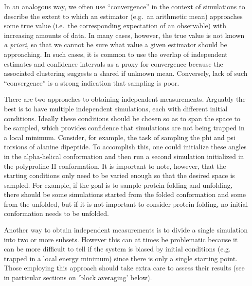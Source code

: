 In an analogous way, we often use ``convergence'' in the context of simulations to describe the extent to which an estimator (e.g.\ an arithmetic mean) approaches some true value (i.e.\ the corresponding expectation of an observable) with increasing amounts of data.  In many cases, however, the true value is not known {\it a priori}, so that we cannot be sure what value a given estimator should be approaching.  In such cases, it is common to use the overlap of independent estimates and confidence intervals as a proxy for convergence because the associated clustering suggests a shared if unknown mean.  Conversely, lack of such ``convergence'' is a strong indication that sampling is poor.

 
 There are two approaches to obtaining independent measurements. Arguably the best is to have multiple independent simulations, each with different initial conditions. Ideally these conditions should be chosen so as to span the space to be sampled, which provides confidence that simulations are not being trapped in a local minimum. Consider, for example, the task of sampling the phi and psi torsions of alanine dipeptide.  To accomplish this, one could initialize these angles in the alpha-helical conformation and then run a second simulation initialized in the polyproline II conformation. It is important to note, however, that the starting conditions only need to be varied enough so that the desired space is sampled. For example, if the goal is to sample protein folding and unfolding, there should be some simulations started from the folded conformation and some from the unfolded, but if it is not important to consider protein folding, no initial conformation needs to be unfolded.

Another way to obtain independent measurements is to divide a single simulation into two or more subsets. However this can at times be problematic because it can be more difficult to tell if the system is biased by initial conditions (e.g. trapped in a local energy minimum) since there is only a single starting point. Those employing this approach should take extra care to assess their results (see in particular sections on 'block averaging' below).


